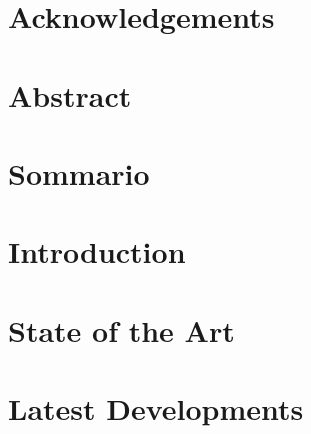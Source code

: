 \documentclass[12pt,a4paper,twoside,openright]{memoir}
\theoremstyle{definition}
\begin{document}
\nonzeroparskip
\frontmatter

\cleardoublepage

\pagestyle{plain}
\chapter*{Acknowledgements}

\cleardoublepage
{}
\tableofcontents
\cleardoublepage
{}
\listoffigures
\cleardoublepage
{}
\listoftables
\chapter{Abstract}

\chapter{Sommario}

\mainmatter
\pagestyle {ruled}
\chapter{Introduction}
\label{chap:intro}

\chapter{State of the Art}
\label{chap:sota}

\chapter{Latest Developments}
\label{chap:latdel}

\end{document}
